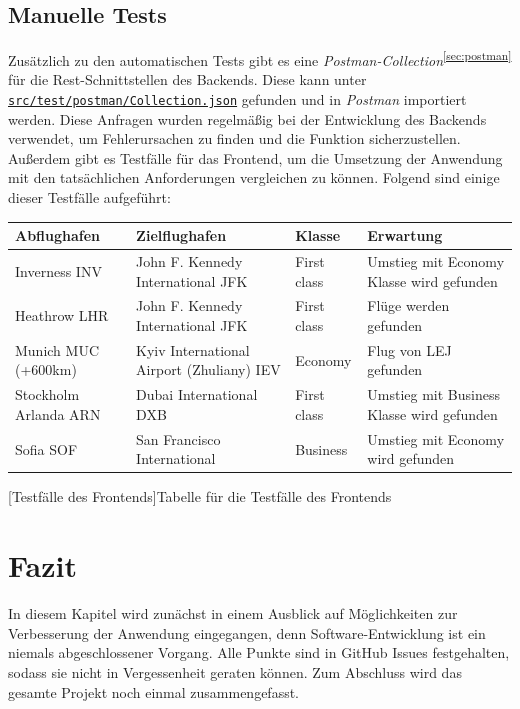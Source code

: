 \documentclass[12pt,twoside,a4paper]{article}
\begin{document}
\begin{sloppypar}
\subsection{Manuelle Tests}
Zusätzlich zu den automatischen Tests gibt es eine \textit{Postman-Collection}\textsuperscript{\ref{sec:postman}} für die Rest-Schnittstellen des Backends. Diese kann unter \href{https://github.com/featherkraken/featherkraken/blob/master/src/test/postman/Collection.json}{\texttt{src/test/postman/Collection.json}} gefunden und in \textit{Postman} importiert werden. Diese Anfragen wurden regelmäßig bei der Entwicklung des Backends verwendet, um Fehlerursachen zu finden und die Funktion sicherzustellen.\\
Außerdem gibt es Testfälle für das Frontend, um die Umsetzung der Anwendung mit den tatsächlichen Anforderungen vergleichen zu können. Folgend sind einige dieser Testfälle aufgeführt:
\vspace{1cm}
\begin{center}
	\captionsetup{type=figure}
	\resizebox{\textwidth}{!}
	{\begin{tabular}{ l | l | l | l }
			\textbf{Abflughafen} & \textbf{Zielflughafen} & \textbf{Klasse} & \textbf{Erwartung} \\
			\hline
			Inverness INV & John F. Kennedy International JFK & First class &  Umstieg mit Economy Klasse wird gefunden\\
			\hline
			Heathrow LHR & John F. Kennedy International JFK & First class &  Flüge werden gefunden\\
			\hline
			Munich MUC (+600km) & Kyiv International Airport (Zhuliany) IEV & Economy &  Flug von LEJ gefunden\\
			\hline
			Stockholm Arlanda ARN & Dubai International DXB & First class &  Umstieg mit Business Klasse wird gefunden\\
			\hline
			Sofia SOF & San Francisco International & Business &  Umstieg mit Economy wird gefunden\\
	\end{tabular}}
	[Testfälle des Frontends]{Tabelle für die Testfälle des Frontends}
	\label{fig:ui-tests}
\end{center}
\newpage
\section{Fazit}
In diesem Kapitel wird zunächst in einem Ausblick auf Möglichkeiten zur Verbesserung der Anwendung eingegangen, denn Software-Entwicklung ist ein niemals abgeschlossener Vorgang. Alle Punkte sind in GitHub Issues festgehalten, sodass sie nicht in Vergessenheit geraten können. Zum Abschluss wird das gesamte Projekt noch einmal zusammengefasst.

\end{sloppypar}
\end{document}
